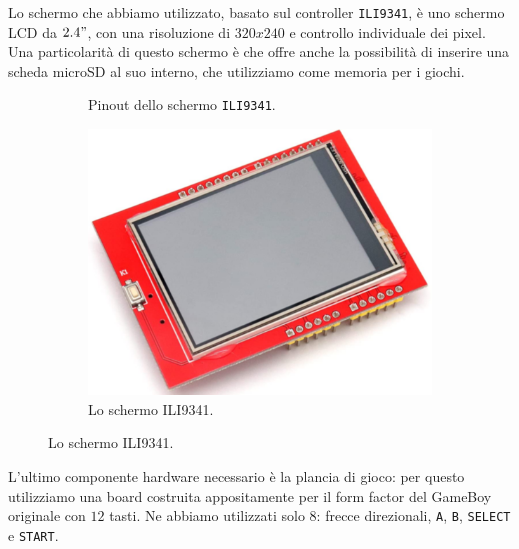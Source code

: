 \documentclass[hidelinks,12pt]{article}
\begin{document}
Lo schermo che abbiamo utilizzato, basato sul controller \texttt{ILI9341}, è
uno schermo LCD da $2.4"$, con una risoluzione di $320x240$ e controllo
individuale dei pixel.
Una particolarità di questo schermo è che offre anche la possibilità di inserire
una scheda microSD al suo interno, che utilizziamo come memoria per i giochi.
\begin{figure}[h]
	\begin{subfigure}[b]{0.45\textwidth}
		\begin{center}
			\begin{tikzpicture}[x=0.015cm, y=0.015cm, scale=0.5, transform shape]
				
			\end{tikzpicture}
		\end{center}
		\caption{Pinout dello schermo \texttt{ILI9341}.}
		\label{fig:pinout_ili}

	\end{subfigure}
	\hfill
	\begin{subfigure}[b]{0.45\textwidth}
		\begin{center}
			\includegraphics[scale=0.4]{figures/ili.png}
		\end{center}
		\caption{Lo schermo ILI9341.}
		\label{fig:ili9341}
	\end{subfigure}
\end{figure}

L'ultimo componente hardware necessario è la plancia di gioco: per questo
utilizziamo una board costruita appositamente per il form factor del GameBoy
originale con $12$ tasti. Ne abbiamo utilizzati solo $8$: frecce direzionali,
\texttt{A}, \texttt{B}, \texttt{SELECT} e \texttt{START}.
\end{document}
